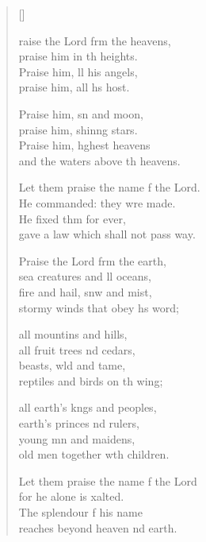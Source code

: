 \settowidth{\versewidth}{Let them praise the name of the Lord. *}
\begin{verse}[\versewidth]
  \begin{patverse}
raise the Lord frm the heavens,\Med\\
    praise him in th heights.\\
Praise him, ll his angels,\Med\\
    praise him, all h\pointup{\i}s host.

Praise him, sn and moon,\Med\\
    praise him, shin\pointup{\i}ng stars.\\
Praise him, h\pointup{\i}ghest heavens\Med\\
    and the waters above th heavens.

Let them praise the name f the Lord.\Med\\
    He commanded: they wre made.\\
He fixed thm for ever,\Med\\
    gave a law which shall not pass way.

Praise the Lord frm the earth,\Med\\
    sea creatures and ll oceans,\\
fire and hail, snw and mist,\Med\\
    stormy winds that obey h\pointup{\i}s word;

all mountins and hills,\Med\\
    all fruit trees nd cedars,\\
beasts, w\pointup{\i}ld and tame,\Med\\
    reptiles and birds on th wing;

all earth’s k\pointup{\i}ngs and peoples,\Med\\
    earth’s princes nd rulers,\\
young mn and maidens,\Med\\
    old men together w\pointup{\i}th children.

Let them praise the name f the Lord\Med\\
    for he alone is xalted.\\
The splendour f his name\Med\\
    reaches beyond heaven nd earth.


\end{patverse}
\end{verse}
